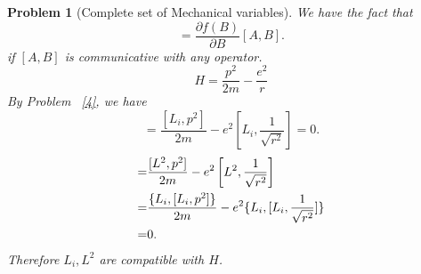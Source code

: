 \documentclass{article}
\theoremstyle{1}
\newtheorem{problem}{Problem}
\newcommand{\pa}{\partial}
\begin{document}
\begin{problem}[Complete set of Mechanical variables]
    We have the fact that 
    \begin{equation}
        [A,f(B)]=\frac{\pa f(B)}{\pa B}[A,B].
    \end{equation}
    if $[A,B]$ is communicative with any operator.
    \begin{equation}
        H=\frac{p^2}{2m}-\frac{e^2}{r}
    \end{equation}
    By Problem ~\ref{4}, we have
    \begin{equation}
        [L_i,H]=\frac{[L_i,p^2]}{2m}-e^2\left[L_i,\frac{1}{\sqrt{r^2}}\right]=0.
    \end{equation}
    \begin{align}
        [L^2,H]=&\frac{[L^2,p^2]}{2m}-e^2\left[L^2,\frac{1}{\sqrt{r^2}}\right]\notag\\
        =&\frac{\{L_i,[L_i,p^2]\}}{2m}-e^2\{L_i,[L_i,\frac{1}{\sqrt{r^2}}]\}\notag\\
        =&0.
    \end{align}
    Therefore $L_i,L^2$ are compatible with $H$.
\end{problem}
\end{document}
